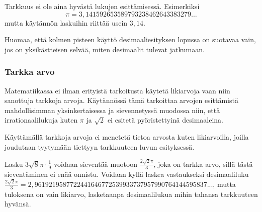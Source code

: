 Tarkkuus ei ole aina hyvästä lukujen esittämisessä. Esimerkiksi
\[ \pi = 3,141592653589793238462643383279 \ldots \]
mutta käytännön laskuihin riittää usein $3,14$.

Huomaa, että kolmen pisteen käyttö desimaaliesityksen lopussa on suotavaa vain, jos on yksikästteisen selvää, miten desimaalit tulevat jatkumaan.

\subsubsection*{Tarkka arvo}

Matematiikassa ei ilman erityistä tarkoitusta käytetä likiarvoja vaan niin sanottuja tarkkoja arvoja. Käytännössä tämä tarkoittaa arvojen esittämistä mahdollisimman yksinkertaisessa ja sievennetyssä muodossa niin, että irrationaalilukuja kuten $\pi$ ja $\sqrt{2}$ ei esitetä pyöristettyinä desimaaleina. %

Käyttämällä tarkkoja arvoja ei menetetä tietoa arvosta kuten likiarvoilla, joilla joudutaan tyytymään tiettyyn tarkkuuteen luvun esityksessä.

\begin{esimerkki}
Lasku $3\sqrt{8}\pi \cdot \frac{1}{9}$ voidaan sieventää muotoon $\frac{2\sqrt{2}\pi}{3}$, joka on tarkka arvo, sillä tästä sieventäminen ei enää onnistu. Voidaan kyllä laskea vastaukseksi desimaaliluku $\frac{2\sqrt{2}\pi}{3}=2,9619219587722441646772539933737957990764144595837...$, mutta tuloksena on vain likiarvo, lasketaanpa desimaalilukua mihin tahansa tarkkuuteen hyvänsä. %
\end{esimerkki}

